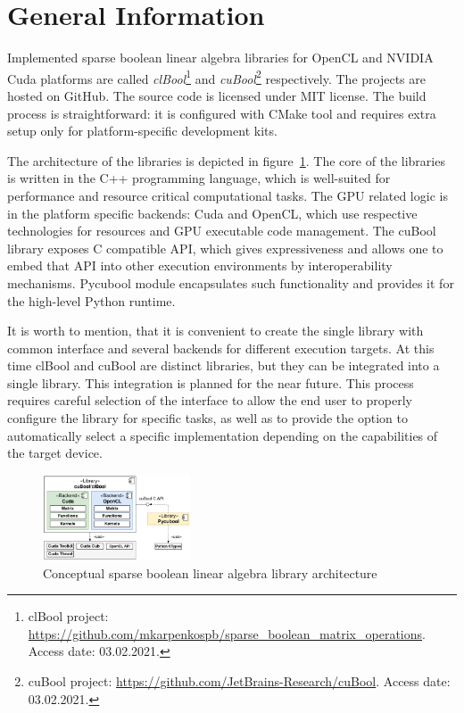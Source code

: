 \section{General Information}



Implemented sparse boolean linear algebra libraries for OpenCL and NVIDIA Cuda platforms are called
\textit{clBool}\footnote{clBool project: \url{https://github.com/mkarpenkospb/sparse_boolean_matrix_operations}. Access date: 03.02.2021.} and 
\textit{cuBool}\footnote{cuBool project: \url{https://github.com/JetBrains-Research/cuBool}. Access date: 03.02.2021.} respectively.
The projects are hosted on GitHub.
The source code is licensed under MIT license.
The build process is straightforward: it is configured with CMake tool and requires extra setup only for platform-specific development kits.

The architecture of the libraries is depicted in figure~\ref{fig:generic_architecture}.
The core of the libraries is written in the C++ programming language, which is well-suited for performance and resource critical computational tasks.
The GPU related logic is in the platform specific backends: Cuda and OpenCL, which use respective technologies for resources and GPU executable code management.
The cuBool library exposes C compatible API, which gives expressiveness and allows one to embed that API into other execution environments by interoperability mechanisms.
Pycubool module encapsulates such functionality and provides it for the high-level Python runtime.

It is worth to mention, that it is convenient to create the single library with common interface and several backends for different execution targets.
At this time clBool and cuBool are distinct libraries, but they can be integrated into a single library.
This integration is planned for the near future.
This process requires careful selection of the interface to allow the end user to properly configure the library for specific tasks, as well as to provide the option to automatically select a specific implementation depending on the capabilities of the target device.

\begin{figure}[t]
    \centering
    \includegraphics[width=0.39\textwidth]{generic_architecture.png}
    \caption{Conceptual sparse boolean linear algebra library architecture}
    \label{fig:generic_architecture}
\end{figure}


